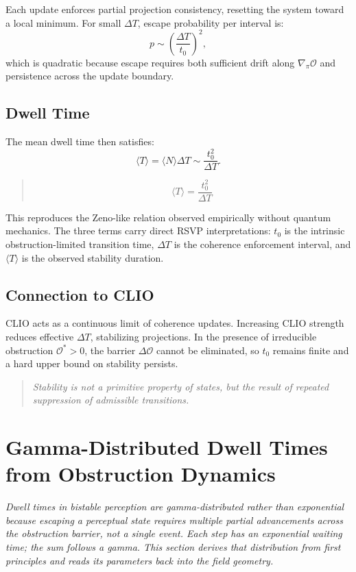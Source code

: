 \documentclass[12pt,a4paper]{article}
\begin{document}
Each update enforces partial projection consistency, resetting the system toward a local minimum. For small $\Delta T$, escape probability per interval is:
\[
p \sim \left(\frac{\Delta T}{t_0}\right)^2,
\]
which is quadratic because escape requires both sufficient drift along $\nabla_\pi \mathcal{O}$ and persistence across the update boundary.

\subsection{Dwell Time}

The mean dwell time then satisfies:
\[
\langle T \rangle = \langle N \rangle \Delta T \sim \frac{t_0^2}{\Delta T}.
\]

\begin{quote}
\[\boxed{\langle T \rangle = \frac{t_0^2}{\Delta T}}\]
\end{quote}

This reproduces the Zeno-like relation observed empirically without quantum mechanics. The three terms carry direct RSVP interpretations: $t_0$ is the intrinsic obstruction-limited transition time, $\Delta T$ is the coherence enforcement interval, and $\langle T \rangle$ is the observed stability duration.

\subsection{Connection to CLIO}

CLIO acts as a continuous limit of coherence updates. Increasing CLIO strength reduces effective $\Delta T$, stabilizing projections. In the presence of irreducible obstruction $\mathcal{O}^* > 0$, the barrier $\Delta\mathcal{O}$ cannot be eliminated, so $t_0$ remains finite and a hard upper bound on stability persists.

\begin{quote}
\emph{Stability is not a primitive property of states, but the result of repeated suppression of admissible transitions.}
\end{quote}

\section{Gamma-Distributed Dwell Times from Obstruction Dynamics}
\label{sec:gamma}

\textit{Dwell times in bistable perception are gamma-distributed rather than exponential because escaping a perceptual state requires multiple partial advancements across the obstruction barrier, not a single event. Each step has an exponential waiting time; the sum follows a gamma. This section derives that distribution from first principles and reads its parameters back into the field geometry.}
\end{document}
